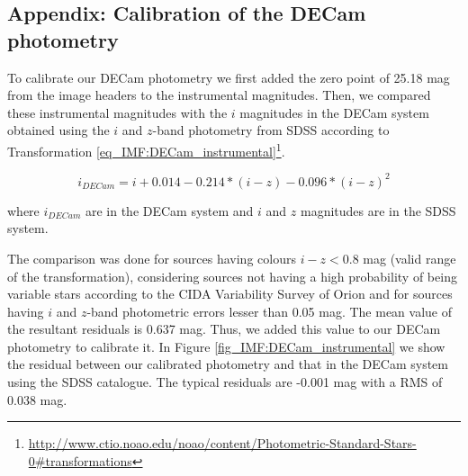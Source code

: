 \documentclass[12pt]{article}
\begin{document}

\subsection{Appendix: Calibration of the DECam photometry}
\label{sec_app_IMF:DECam_calibration}
To calibrate our DECam photometry we first added the zero point of 25.18 mag from the image headers to the instrumental magnitudes. Then, we compared these instrumental magnitudes with the $i$ magnitudes in the DECam system obtained using the $i$ and $z$-band photometry from SDSS according to Transformation \ref{eq_IMF:DECam_instrumental}\footnote{\url{http://www.ctio.noao.edu/noao/content/Photometric-Standard-Stars-0\#transformations}}.

\begin{equation} \label{eq_IMF:DECam_instrumental}
	i_{DECam}    = i + 0.014 - 0.214*(i-z) - 0.096*(i-z)^2
\end{equation}

where $i_{DECam}$ are in the DECam system and $i$ and $z$ magnitudes are in the SDSS system.

The comparison was done for sources having colours $i-z<0.8$ mag (valid range of the transformation), considering sources not having a high probability of being variable stars according to the CIDA Variability Survey of Orion \citep[][]{Briceno2005,Mateu2012,Briceno2018} and for sources having $i$ and $z$-band photometric errors lesser than 0.05 mag. The mean value of the resultant residuals is 0.637 mag. Thus, we added this value to our DECam photometry to calibrate it. In Figure \ref{fig_IMF:DECam_instrumental} we show the residual between our calibrated photometry and that in the DECam system using the SDSS catalogue. The typical residuals are -0.001 mag with a RMS of 0.038 mag.
\end{document}
